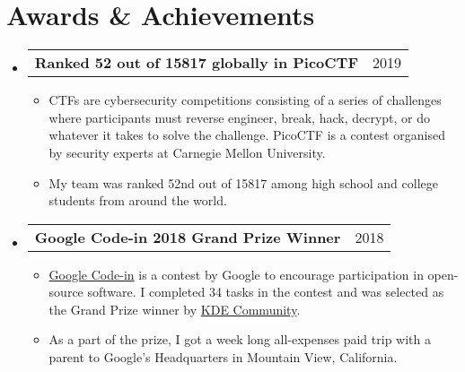\documentclass[letterpaper,11pt]{article}
\makeatletter
\newcommand{\sresumeItem}[1]{
  \item\small{
    { #1 \vspace{-2pt}}
  }
}
\newcommand{\shortResumeSubheading}[2]{
  \vspace{-1pt}\item
    \begin{tabular*}{0.97\textwidth}[t]{l@{\extracolsep{\fill}}r}
      \textbf{#1} & #2 \\
    \end{tabular*}
  \vspace{-5pt}
}
\newcommand{\resumeSubHeadingListStart}{\begin{itemize}[leftmargin=*]}
\newcommand{\resumeSubHeadingListEnd}{\end{itemize}}
\newcommand{\resumeItemListStart}{\begin{itemize}}
\newcommand{\resumeItemListEnd}{\end{itemize}\vspace{-5pt}}
\makeatother
\begin{document}
\section{Awards \& Achievements}
  \resumeSubHeadingListStart

    \shortResumeSubheading
      {Ranked 52 out of 15817 globally in PicoCTF}{2019}
      \resumeItemListStart
        \sresumeItem
          {CTFs are cybersecurity competitions consisting of a series of challenges where participants must reverse engineer, break, hack, decrypt, or do whatever it takes to solve the challenge. PicoCTF is a contest organised by security experts at Carnegie Mellon University.}
        \sresumeItem
          {My team was ranked 52nd out of 15817 among high school and college students from around the world.}
      \resumeItemListEnd

    \shortResumeSubheading
      {Google Code-in 2018 Grand Prize Winner}{2018}
      \resumeItemListStart
        \sresumeItem
          {\href{http://g.co/gci/}{Google Code-in} is a contest by Google to encourage participation in open-source software. I completed 34 tasks in the contest and was selected as the Grand Prize winner by \href{https://kde.org/}{KDE Community}.}
        \sresumeItem
          {As a part of the prize, I got a week long all-expenses paid trip with a parent to Google's Headquarters in Mountain View, California.}
      \resumeItemListEnd

  \resumeSubHeadingListEnd

\end{document}
